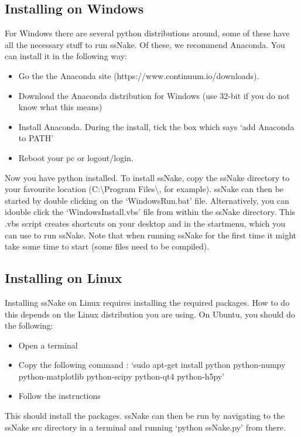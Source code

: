 \documentclass[11pt,a4paper]{article}
\begin{document}
\subsection{Installing on Windows}
For Windows there are several python distributions around, some of these have all the necessary stuff to run ssNake. Of these, we recommend Anaconda. You can install it in the following way:
\begin{itemize}
\item Go the the Anaconda site (https://www.continuum.io/downloads).
\item Download the Anaconda distribution for Windows (use 32-bit if you do not know what this means)
\item Install Anaconda. During the install, tick the box which says `add Anaconda to PATH'
\item Reboot your pc or logout/login.
\end{itemize}
Now you have python installed. To install ssNake, copy the ssNake directory to your favourite
location (C:\textbackslash{}Program Files\textbackslash{}, for example).  ssNake can then be started
by double clicking on the `WindowsRun.bat' file. Alternatively, you can idouble click the
`WindowsInstall.vbs' file from within the ssNake directory. This .vbs script creates shortcuts on
your desktop and in the startmenu, which you can use to run ssNake. Note that when running ssNake
for the first time it might take some time to start (some files need to be compiled).

\subsection{Installing on Linux}
Installing ssNake on Linux requires installing the required packages. How to do this depends on the Linux distribution you are using. On Ubuntu, you should do the following:
\begin{itemize}
\item Open a terminal
\item Copy the following command : `sudo apt-get install python python-numpy python-matplotlib python-scipy python-qt4 python-h5py'
\item Follow the instructions
\end{itemize}
This should install the packages. ssNake can then be run by navigating to the ssNake src directory in a
terminal and running `python ssNake.py' from there.
\end{document}
